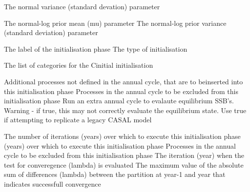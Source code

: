  {The normal variance (standard devation) parameter}
\par\textbf{}\par
{} {The normal-log prior mean (mu) parameter}
 {The normal-log prior variance (standard deviation) parameter}
\par\textbf{}\par
\par\textbf{}\par
{}\par\par
{} {The label of the initialisation phase}
 {The type of initialisation}
\par\textbf{}\par
{} {The list of categories for the Cinitial initialisation}
\par\textbf{}\par
{} {Additional processes not defined in the annual cycle, that are to beinserted into this initialisation phase}
 {Processes in the annual cycle to be excluded from this initialisation phase}
 {Run an extra annual cycle to evalaute equilibrium SSB's. Warning - if true, this may not correctly evaluate the equilibrium state. Use true if attempting to replicate a legacy CASAL model}
\par\textbf{}\par
{} {The number of iterations (years) over which to execute this initialisation phase}
 {(years) over which to execute this initialisation phase}
 {Processes in the annual cycle to be excluded from this initialisation phase}
 {The iteration (year) when the test for converegence (lambda) is evaluated}
 {The maximum value of the absolute sum of differences (lambda) between the partition at year-1 and year that indicates successfull convergence}
\par\textbf{}\par
